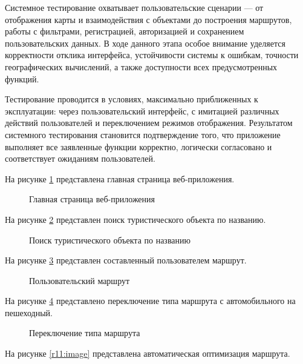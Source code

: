 Системное тестирование охватывает пользовательские сценарии — от отображения карты и взаимодействия с объектами до построения маршрутов, работы с фильтрами, регистрацией, авторизацией и сохранением пользовательских данных. В ходе данного этапа особое внимание уделяется корректности отклика интерфейса, устойчивости системы к ошибкам, точности географических вычислений, а также доступности всех предусмотренных функций.

Тестирование проводится в условиях, максимально приближенных к эксплуатации: через пользовательский интерфейс, с имитацией различных действий пользователей и переключением режимов отображения. Результатом системного тестирования становится подтверждение того, что приложение выполняет все заявленные функции корректно, логически согласовано и соответствует ожиданиям пользователей.

На рисунке \ref{r1:image} представлена главная страница веб-приложения.

\begin{figure}[H] %
\center{\texttt{[image: r1]}}
\caption{Главная страница веб-приложения}
\label{r1:image}
\end{figure}

\newpage
На рисунке \ref{r2:image} представлен поиск туристического объекта по названию.

\begin{figure}[H]
\center{\texttt{[image: r2]}}
\caption{Поиск туристического объекта по названию}
\label{r2:image}
\end{figure}

На рисунке \ref{r3:image} представлен составленный пользователем маршрут.

\begin{figure}[H]
\center{\texttt{[image: r3]}}
\caption{Пользовательский маршрут}
\label{r3:image}
\end{figure}

\newpage
На рисунке \ref{r4:image} представлено переключение типа маршрута с автомобильного на пешеходный.

\begin{figure}[H]
	\center{\texttt{[image: r4]}}
	\caption{Переключение типа маршрута}
	\label{r4:image}
\end{figure}


На рисунке \ref{r11:image} представлена автоматическая оптимизация маршрута.

